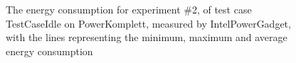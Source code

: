 \begin{figure}
                    \caption{The energy consumption for experiment \#2, of test case TestCaseIdle on PowerKomplett, measured by IntelPowerGadget, with the lines representing the minimum, maximum and average energy consumption} \label{fig:time_series_TestCaseIdle_PowerKomplett_IntelPowerGadget_exp2}
                    \end{figure}
                    